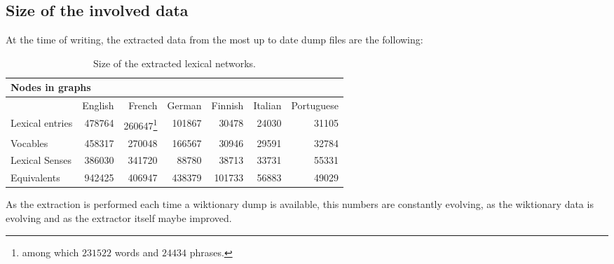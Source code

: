 \documentclass[sw]{iosart2c}
\begin{document}
\subsection{Size of the involved data}

At the time of writing, the extracted data from the most up to date dump files are the following:

\begin{table}[htb]
\begin{minipage}{\linewidth}
\begin{tabular}{lrrrrrr}
\multicolumn{4}{l}{\textbf{Nodes in graphs}}\\
\hline
				 & English &  French  & German & Finnish & Italian & Portuguese \\
Lexical entries &  478764 &  260647\footnote{among which $231522$ words and $24434$ phrases.}  
				 					   & 101867  &  30478 & 24030   & 31105         \\
Vocables 	     & 458317  & 270048  & 166567   & 30946 & 29591  &  32784    \\
Lexical Senses
			     & 386030  & 341720  & 88780   & 38713   &  33731  & 55331      \\
Equivalents
			     & 942425  & 406947 & 438379  & 101733 & 56883   & 49029       \\
\end{tabular}
\end{minipage}
\caption{Size of the extracted lexical networks.}
\label{table:size}
\end{table}

As the extraction is performed each time a wiktionary dump is available, this numbers are constantly evolving, as the wiktionary data is evolving and as the extractor itself maybe improved.
\end{document}
